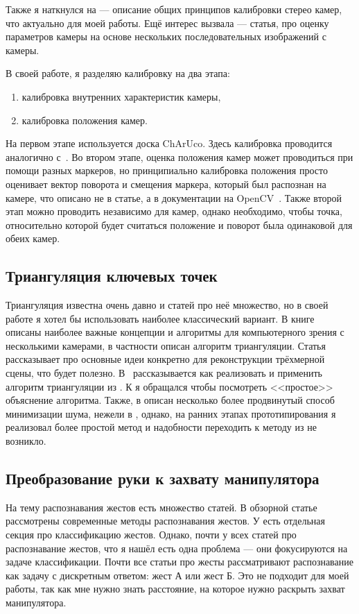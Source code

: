 \documentclass[14pt, a4paper]{extarticle}
\begin{document}
Также я наткнулся на \cite{three-stereo-principals} --- описание общих принципов
калибровки стерео камер, что актуально для моей работы. Ещё интерес вызвала
\cite{camera-self-calibration} --- статья, про оценку параметров камеры на
основе нескольких последовательных изображений с камеры.

В своей работе, я разделяю калибровку на два этапа:
\begin{enumerate}
    \item калибровка внутренних характеристик камеры,
    \item калибровка положения камер.
\end{enumerate}
На первом этапе используется доска ChArUco. Здесь калибровка проводится
аналогично с~\cite{opencv_charuco}. Во втором этапе, оценка положения камер
может проводиться при помощи разных маркеров, но принципиально калибровка
положения просто оценивает вектор поворота и смещения маркера, который был
распознан на камере, что описано не в статье, а в документации на
OpenCV~\cite{opencv_charuco_pose}. Также второй этап можно проводить независимо
для камер, однако необходимо, чтобы точка, относительно которой будет считаться
положение и поворот была одинаковой для обеих камер.

\subsection{Триангуляция ключевых точек}
Триангуляция известна очень давно и статей про неё множество, но в своей работе
я хотел бы использовать наиболее классический вариант. В
книге~\cite{multiview_cv} описаны наиболее важные концепции и алгоритмы для
компьютерного зрения с несколькими камерами, в частности описан алгоритм
триангуляции. Статья \cite{basics-of-reconstruction} рассказывает про основные
идеи конкретно для реконструкции трёхмерной сцены, что будет полезно.
В~\cite{dlt_temugeb} рассказывается как реализовать и применить алгоритм
триангуляции из \cite{multiview_cv}. К \cite{dlt_temugeb} я обращался чтобы
посмотреть <<простое>> объяснение алгоритма. Также, в \cite{multiview_cv} описан
несколько более продвинутый способ минимизации шума, нежели в
\cite{dlt_temugeb}, однако, на ранних этапах прототипирования я реализовал
более простой метод и надобности переходить к методу из \cite{multiview_cv} не
возникло.

\subsection{Преобразование руки к захвату манипулятора}
На тему распознавания жестов есть множество статей. В обзорной статье
\cite{gesture-survey} рассмотрены современные методы распознавания жестов.
У \cite{mediapipe_paper} есть отдельная секция про классификацию жестов.
Однако, почти у всех статей про распознавание жестов, что я нашёл есть одна
проблема --- они фокусируются на задаче классификации. Почти все статьи про
жесты рассматривают распознавание как задачу с дискретным ответом: жест А или
жест Б. Это не подходит для моей работы, так как мне нужно знать расстояние, на
которое нужно раскрыть захват манипулятора.
\end{document}
